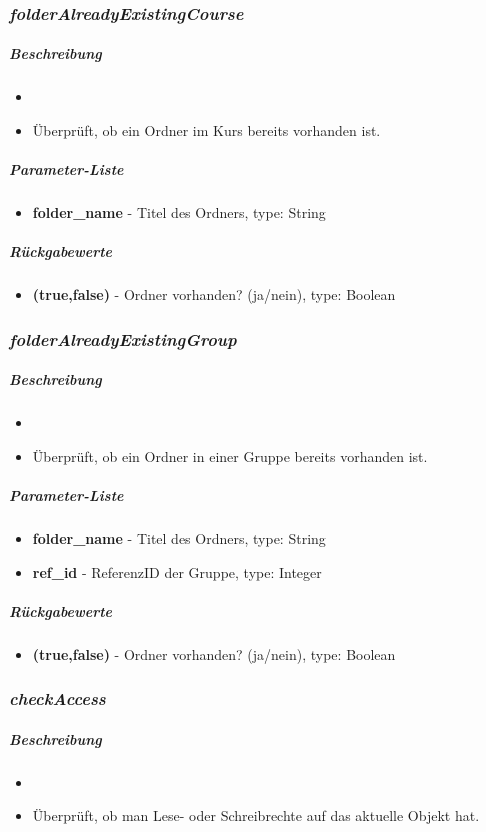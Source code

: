 \subsubsection*{\textit{folderAlreadyExistingCourse}}\label{folderAlreadyExistingCourseGGUI}
\subparagraph{Beschreibung}
\begin{itemize}
	\item[] \noindent{}
	\item[] Überprüft, ob ein Ordner im Kurs bereits vorhanden ist.
\end{itemize}
\subparagraph{Parameter-Liste}
\begin{itemize}
	\item[] \textbf{folder\_name} - Titel des Ordners, type: String
\end{itemize}
\subparagraph{Rückgabewerte}
\begin{itemize}
	\item[] \textbf{(true,false)} - Ordner vorhanden? (ja/nein), type: Boolean
\end{itemize}

\subsubsection*{\textit{folderAlreadyExistingGroup}}\label{folderAlreadyExistingGroupGGUI}
\subparagraph{Beschreibung}
\begin{itemize}
	\item[] \noindent{}
	\item[] Überprüft, ob ein Ordner in einer Gruppe bereits vorhanden ist.
\end{itemize}
\subparagraph{Parameter-Liste}
\begin{itemize}
	\item[] \textbf{folder\_name} - Titel des Ordners, type: String 
	\item[] \textbf{ref\_id} - ReferenzID der Gruppe, type: Integer
\end{itemize}
\subparagraph{Rückgabewerte}
\begin{itemize}
	\item[] \textbf{(true,false)} - Ordner vorhanden? (ja/nein), type: Boolean
\end{itemize}

\subsubsection*{\textit{checkAccess}}\label{checkAccessGGUI}
\subparagraph{Beschreibung}
\begin{itemize}
	\item[] \noindent{}
	\item[] Überprüft, ob man Lese- oder Schreibrechte auf das aktuelle Objekt hat.
\end{itemize}